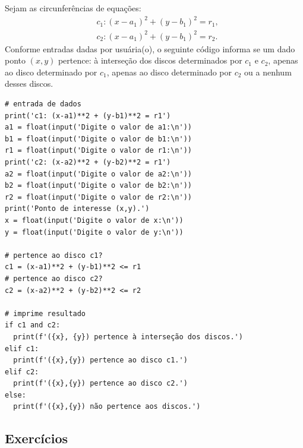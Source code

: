 \begin{ex}
  Sejam as circunferências de equações:
  \begin{align}
    & c_1: (x-a_1)^2 + (y-b_1)^2 = r_1, \\
    & c_2: (x-a_1)^2 + (y-b_1)^2 = r_2.
  \end{align}
  Conforme entradas dadas por usuária(o), o seguinte código informa se um dado ponto $(x, y)$ pertence: à interseção dos discos determinados por $c_1$ e $c_2$, apenas ao disco determinado por $c_1$, apenas ao disco determinado por $c_2$ ou a nenhum desses discos.

\begin{lstlisting}
# entrada de dados
print('c1: (x-a1)**2 + (y-b1)**2 = r1')
a1 = float(input('Digite o valor de a1:\n'))
b1 = float(input('Digite o valor de b1:\n'))
r1 = float(input('Digite o valor de r1:\n'))
print('c2: (x-a2)**2 + (y-b2)**2 = r1')
a2 = float(input('Digite o valor de a2:\n'))
b2 = float(input('Digite o valor de b2:\n'))
r2 = float(input('Digite o valor de r2:\n'))
print('Ponto de interesse (x,y).')
x = float(input('Digite o valor de x:\n'))
y = float(input('Digite o valor de y:\n'))

# pertence ao disco c1?
c1 = (x-a1)**2 + (y-b1)**2 <= r1
# pertence ao disco c2?
c2 = (x-a2)**2 + (y-b2)**2 <= r2

# imprime resultado
if c1 and c2:
  print(f'({x}, {y}) pertence à interseção dos discos.')
elif c1:
  print(f'({x},{y}) pertence ao disco c1.')
elif c2:
  print(f'({x},{y}) pertence ao disco c2.')
else:
  print(f'({x},{y}) não pertence aos discos.')
\end{lstlisting}

\end{ex}


\subsection{Exercícios}


